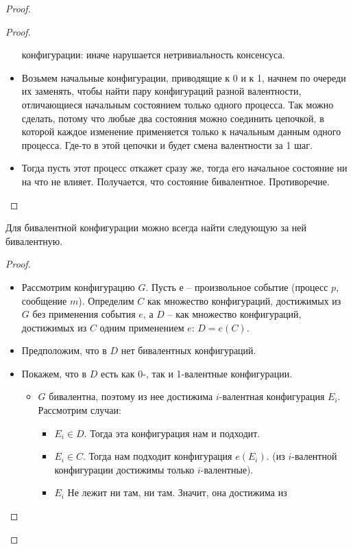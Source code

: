 \begin{proof}
\begin{proof}
\begin{itemize}
                конфигурации: иначе нарушается нетривиальность консенсуса.
            \item Возьмем начальные конфигурации, приводящие к 0 и к 1, начнем
                по очереди их заменять, чтобы найти пару конфигураций разной валентности,
                отличающиеся начальным состоянием только одного процесса. Так можно сделать,
                потому что любые два состояния можно соединить цепочкой, в которой каждое
                изменение применяется только к начальным данным одного процесса. Где-то
                в этой цепочки и будет смена валентности за 1 шаг.
            \item Тогда пусть этот процесс откажет сразу же, тогда его начальное состояние
                ни на что не влияет. Получается, что состояние бивалентное. Противоречие.
        \end{itemize}
    \end{proof}
    \begin{lemma}
        Для бивалентной конфигурации можно всегда найти следующую за ней бивалентную.
    \end{lemma}
    \begin{proof} 
        \enewline
        \begin{itemize}
            \item Рассмотрим конфигурацию $G$. Пусть $е$ -- произвольное событие (процесс $p$, сообщение $m$).
                Определим $C$ как множество конфигураций, достижимых из $G$ без применения
                события $e$, а $D$ -- как множество конфигураций, достижимых из $C$
                одним применением $e$: $D = e(C)$.
            \item Предположим, что в $D$ нет бивалентных конфигураций.
            \item Покажем, что в $D$ есть как 0-, так и 1-валентные конфигурации.
                \begin{itemize}
                    \item $G$ бивалентна, поэтому из нее достижима $i$-валентная
                        конфигурация $E_i$. Рассмотрим случаи:
                        \begin{itemize}
                            \item $E_i \in D$. Тогда эта конфигурация нам и подходит.
                            \item $E_i \in C$. Тогда нам подходит конфигурация $e(E_i)$.
                                (из $i$-валентной конфигурации достижимы только $i$-валентные).
                            \item $E_i$ Не лежит ни там, ни там. Значит, она достижима из

\end{itemize}
\end{itemize}
\end{itemize}
\end{proof}
\end{proof}

